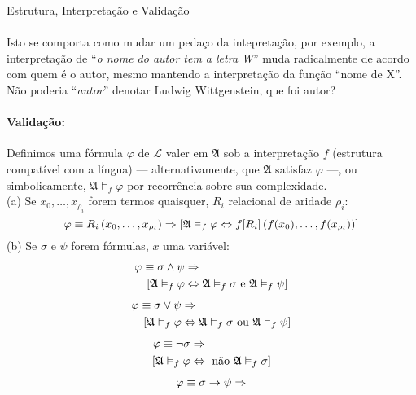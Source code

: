 \begin{definition}{Estrutura, Interpretação e Validação}
        \paragraph{}
            Isto se comporta como mudar um pedaço da intepretação, por exemplo, a 
            interpretação de ``\emph{o nome do autor tem a letra W}'' muda radicalmente 
            de acordo com quem é o autor, mesmo mantendo a interpretação da função ``nome 
            de X''. Não poderia ``\emph{autor}'' denotar Ludwig Wittgenstein, que foi 
            autor?

        \paragraph{Validação:}
            Definimos uma fórmula $\varphi$ de $\mathcal{L}$ valer em $\mathfrak{A}$ sob 
            a interpretação $f$ (estrutura compatível com a língua) --- alternativamente, 
            que $\mathfrak{A}$ satisfaz $\varphi$ ---, ou simbolicamente, $\mathfrak{A}
            \vDash_{f}\varphi$ por recorrência sobre sua complexidade.\\
        (a) Se $x_0,\ldots,x_{\rho_i}$ forem termos quaisquer, $R_i$ relacional de aridade $\rho_i$:
            $$\varphi\equiv R_i\POINT{x_0}{\ldots}{x_{\rho_i}}
                \RAR\left[\mathfrak A\vDash_f\varphi \BIM f[R_i]\POINT{f(x_0)}{\ldots}{f(x_{\rho_i})}\right]$$
        (b) Se $\sigma$ e $\psi$ forem fórmulas, $x$ uma variável:
            \begin{align*}
                \varphi\equiv \sigma\land\psi &\RAR\\
                    [\mathfrak{A}\vDash_f\varphi&\BIM\mathfrak A\vDash_f\sigma\text{ e  }\mathfrak A\vDash_f\psi]
            \end{align*}
            \begin{align*}
                \varphi\equiv \sigma\lor \psi &\RAR\\
                    [\mathfrak{A}\vDash_f\varphi&\BIM\mathfrak A\vDash_f\sigma\text{ ou }\mathfrak A\vDash_f\psi]
            \end{align*}
            \begin{align*}
                \varphi\equiv \neg\sigma      &\RAR\\
                    [\mathfrak{A}\vDash_f\varphi&\BIM\text{ não }\mathfrak A\vDash_f\sigma]
            \end{align*}
            \begin{align*}
                \varphi\equiv \sigma\rar\psi  &\RAR\\

\end{align*}
\end{definition}
